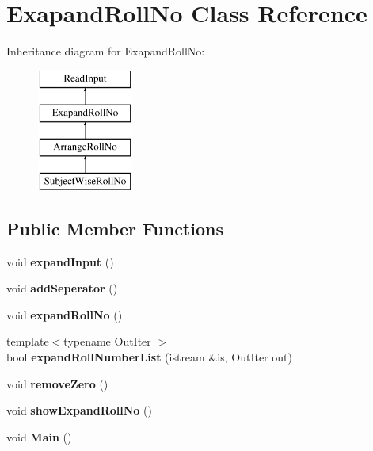 \hypertarget{classExapandRollNo}{\section{Exapand\-Roll\-No Class Reference}
\label{classExapandRollNo}
}
Inheritance diagram for Exapand\-Roll\-No\-:\begin{figure}[H]
\begin{center}
\leavevmode
\includegraphics[height=4.000000cm]{classExapandRollNo}
\end{center}
\end{figure}
\subsection*{Public Member Functions}
\begin{DoxyCompactItemize}
\item 
\hypertarget{classExapandRollNo_a19a299d6ebbff3af32fdee08fcc164ee}{void {\bfseries expand\-Input} ()}\label{classExapandRollNo_a19a299d6ebbff3af32fdee08fcc164ee}

\item 
\hypertarget{classExapandRollNo_ad1a2a298aa0834a6da672e152cd4e24f}{void {\bfseries add\-Seperator} ()}\label{classExapandRollNo_ad1a2a298aa0834a6da672e152cd4e24f}

\item 
\hypertarget{classExapandRollNo_a9125b4dc6bbdb81dc4007cec1e86a7e9}{void {\bfseries expand\-Roll\-No} ()}\label{classExapandRollNo_a9125b4dc6bbdb81dc4007cec1e86a7e9}

\item 
\hypertarget{classExapandRollNo_a69ff3dc919a8b297b46926839184b349}{{\footnotesize template$<$typename Out\-Iter $>$ }\\bool {\bfseries expand\-Roll\-Number\-List} (istream \&is, Out\-Iter out)}\label{classExapandRollNo_a69ff3dc919a8b297b46926839184b349}

\item 
\hypertarget{classExapandRollNo_a3b767bfce279771a398abaa725753e33}{void {\bfseries remove\-Zero} ()}\label{classExapandRollNo_a3b767bfce279771a398abaa725753e33}

\item 
\hypertarget{classExapandRollNo_ae11d041a516d6fce629364d6e6796955}{void {\bfseries show\-Expand\-Roll\-No} ()}\label{classExapandRollNo_ae11d041a516d6fce629364d6e6796955}

\item 
\hypertarget{classExapandRollNo_afbfccde139eb71155e0b0fce02962d1c}{void {\bfseries Main} ()}\label{classExapandRollNo_afbfccde139eb71155e0b0fce02962d1c}

\end{DoxyCompactItemize}
